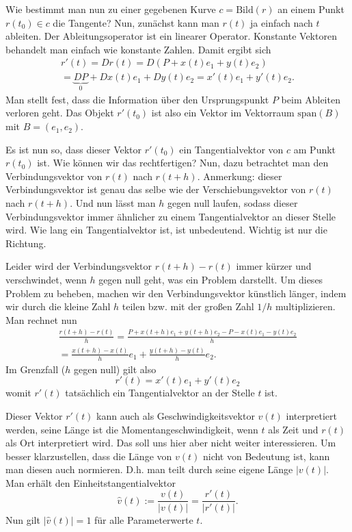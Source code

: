 \documentclass[a4paper,12pt,fleqn]{article}
\begin{document}
Wie bestimmt man nun zu einer gegebenen Kurve $c=\mathrm{Bild}(r)$
an einem Punkt $r(t_0)\in c$ die Tangente? Nun, zunächst kann man
$r(t)$ ja einfach nach $t$ ableiten. Der Ableitungsoperator
ist ein linearer Operator. Konstante Vektoren behandelt man einfach
wie konstante Zahlen. Damit ergibt sich
\begin{gather*}
r'(t) = Dr(t) = D(P+x(t)e_1+y(t)e_2)\\
= \underbrace{DP}_{0}+Dx(t)e_1+Dy(t)e_2 = x'(t)e_1+y'(t)e_2.
\end{gather*}
Man stellt fest, dass die Information über den Ursprungspunkt $P$
beim Ableiten verloren geht. Das Objekt $r'(t_0)$ ist also ein
Vektor im Vektorraum $\mathrm{span}(B)$ mit $B=(e_1,e_2)$.

Es ist nun so, dass dieser Vektor $r'(t_0)$ ein Tangentialvektor
von $c$ am Punkt $r(t_0)$ ist. Wie können wir das rechtfertigen?
Nun, dazu betrachtet man den Verbindungsvektor von $r(t)$ nach
$r(t+h)$. Anmerkung: dieser Verbindungsvektor ist genau das selbe
wie der Verschiebungsvektor von $r(t)$ nach $r(t+h)$.
Und nun lässt man $h$ gegen null laufen, sodass dieser
Verbindungsvektor immer ähnlicher zu einem Tangentialvektor an dieser
Stelle wird. Wie lang ein Tangentialvektor ist, ist unbedeutend.
Wichtig ist nur die Richtung.

Leider wird der Verbindungsvektor $r(t+h)-r(t)$ immer kürzer
und verschwindet, wenn $h$ gegen null geht, was ein Problem darstellt.
Um dieses Problem zu beheben, machen wir den Verbindungsvektor
künstlich länger, indem wir durch die kleine Zahl $h$ teilen bzw. mit
der großen Zahl $1/h$ multiplizieren. Man rechnet nun
\begin{gather*}
\frac{r(t+h)-r(t)}{h}
= \frac{P+x(t+h)e_1+y(t+h)e_2-P-x(t)e_1-y(t)e_2}{h}\\
= \frac{x(t+h)-x(t)}{h}e_1 + \frac{y(t+h)-y(t)}{h}e_2.
\end{gather*}
Im Grenzfall ($h$ gegen null) gilt also
\[r'(t) = x'(t)e_1+y'(t)e_2\]
womit $r'(t)$ tatsächlich ein Tangentialvektor an der Stelle $t$
ist.

Dieser Vektor $r'(t)$ kann auch als Geschwindigkeitsvektor $v(t)$
interpretiert werden, seine Länge ist die Momentangeschwindigkeit,
wenn $t$ als Zeit und $r(t)$ als Ort interpretiert wird.
Das soll uns hier aber nicht weiter interessieren.
Um besser klarzustellen, dass die Länge von $v(t)$
nicht von Bedeutung ist, kann man diesen auch normieren.
D.h. man teilt durch seine eigene Länge $|v(t)|$.
Man erhält den Einheitstangentialvektor
\begin{equation}
\hat v(t) := \frac{v(t)}{|v(t)|} = \frac{r'(t)}{|r'(t)|}.
\end{equation}
Nun gilt $|\hat v(t)|=1$ für alle Parameterwerte $t$.
\end{document}
